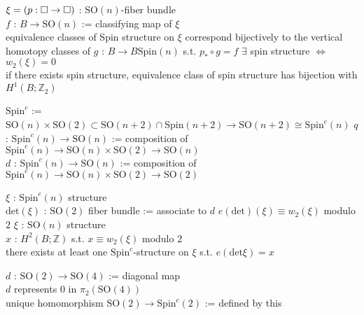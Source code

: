 \documentclass[dvipdfmx]{jsarticle}
\begin{document}
\begin{Theorem}
\itemprop
  \For \(\xi = (p : \square \to \square)\) : \(\text{SO}(n)\)-fiber bundle \\
  \Let \(f\) : \(B \to \text{SO}(n)\) := classifying map of \(\xi\) \\
  \Then equivalence classes of Spin structure on \(\xi\) correspond bijectively to the vertical homotopy classes of \(g\) : \(B \to B\text{Spin}(n)\) s.t. \(p_* \circ g = f\) 
\itemprop
  \Then \(\exists\) spin structure \(\Leftrightarrow\) \(w_2(\xi) = 0\) \\
  \Then if there exists spin structure, equivalence class of spin structure has bijection with \(H^1(B; \mathbb{Z}_2)\)
\end{Theorem}

\begin{Definition}
\itemdefi
  \Define \(\text{Spin}^c\) := 
\itemprop
  \Then \(\text{SO}(n) \times \text{SO}(2) \subset \text{SO}(n+2) \cap \text{Spin}(n+2) \to \text{SO}(n+2) \cong \text{Spin}^c(n)\)
\itemdefi
  \Define \(q\) : \(\text{Spin}^c(n) \to \text{SO}(n)\) := composition of \(\text{Spin}^c(n) \to \text{SO}(n) \times \text{SO}(2) \to \text{SO}(n)\) \\
  \Define \(d\) : \(\text{Spin}^c(n) \to \text{SO}(n)\) := composition of \(\text{Spin}^c(n) \to \text{SO}(n) \times \text{SO}(2) \to \text{SO}(2)\)
\end{Definition}

\begin{Theorem}
\itemwhen
  \For \(\xi\) : \(\text{Spin}^c(n)\) structure \\
  \Let \(\text{det}(\xi)\) : \(\text{SO}(2)\) fiber bundle := associate to \(d\)
\itemprop
  \Then \(e(\text{det})(\xi) \equiv w_2(\xi)\) modulo \(2\)
\itemprop
  \For \(\xi\) : \(\text{SO}(n)\) structure \\
  \For \(x\) : \(H^2(B;\mathbb{Z})\) s.t. \(x \equiv w_2(\xi)\) modulo \(2\) \\
  \Then there exists at least one \(\text{Spin}^c\)-structure on \(\xi\) s.t. \(e(\text{det} \xi) = x\)
\end{Theorem}

\begin{Definition}
\itemdefi
  \Let \(d\) : \(\text{SO}(2) \to \text{SO}(4)\) := diagonal map \\
  \Then \(d\) represents \(0\) in \(\pi_2(\text{SO}(4))\) \\
  \Define unique homomorphism \(\text{SO}(2) \to \text{Spin}^c(2)\) := defined by this \\
\end{Definition}
\end{document}
